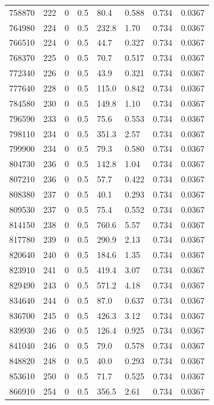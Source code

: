 \documentclass[preview]{standalone}
\begin{document}
{{{{{{{{{{{{\begin{tabular}{L{1.2cm}C{1.2cm} C{0.3cm}C{0.5cm} C{1.4cm}C{1.4cm} C{1.4cm}C{1.4cm}}
  758870  &   222  & 0     & 0.5 &  80.4  & 0.588  & 0.734 &  0.0367   \\ 
  764980  &   224  & 0     & 0.5 &  232.8  & 1.70  & 0.734 &  0.0367   \\ 
  766510  &   224  & 0     & 0.5 &  44.7  & 0.327  & 0.734 &  0.0367   \\ 
  768370  &   225  & 0     & 0.5 &  70.7  & 0.517  & 0.734 &  0.0367   \\ 
  772340  &   226  & 0     & 0.5 &  43.9  & 0.321  & 0.734 &  0.0367   \\ 
  777640  &   228  & 0     & 0.5 &  115.0  & 0.842  & 0.734 &  0.0367   \\ 
  784580  &   230  & 0     & 0.5 &  149.8  & 1.10  & 0.734 &  0.0367   \\ 
  796590  &   233  & 0     & 0.5 &  75.6  & 0.553  & 0.734 &  0.0367   \\ 
  798110  &   234  & 0     & 0.5 &  351.3  & 2.57  & 0.734 &  0.0367   \\ 
  799900  &   234  & 0     & 0.5 &  79.3  & 0.580  & 0.734 &  0.0367   \\ 
  804730  &   236  & 0     & 0.5 &  142.8  & 1.04  & 0.734 &  0.0367   \\ 
  807210  &   236  & 0     & 0.5 &  57.7  & 0.422  & 0.734 &  0.0367   \\ 
  808380  &   237  & 0     & 0.5 &  40.1  & 0.293  & 0.734 &  0.0367   \\ 
  809530  &   237  & 0     & 0.5 &  75.4  & 0.552  & 0.734 &  0.0367   \\ 
  814150  &   238  & 0     & 0.5 &  760.6  & 5.57  & 0.734 &  0.0367   \\ 
  817780  &   239  & 0     & 0.5 &  290.9  & 2.13  & 0.734 &  0.0367   \\ 
  820640  &   240  & 0     & 0.5 &  184.6  & 1.35  & 0.734 &  0.0367   \\ 
  823910  &   241  & 0     & 0.5 &  419.4  & 3.07  & 0.734 &  0.0367   \\ 
  829490  &   243  & 0     & 0.5 &  571.2  & 4.18  & 0.734 &  0.0367   \\ 
  834640  &   244  & 0     & 0.5 &  87.0  & 0.637  & 0.734 &  0.0367   \\ 
  836700  &   245  & 0     & 0.5 &  426.3  & 3.12  & 0.734 &  0.0367   \\ 
  839930  &   246  & 0     & 0.5 &  126.4  & 0.925  & 0.734 &  0.0367   \\ 
  841040  &   246  & 0     & 0.5 &  79.0  & 0.578  & 0.734 &  0.0367   \\ 
  848820  &   248  & 0     & 0.5 &  40.0  & 0.293  & 0.734 &  0.0367   \\ 
  853610  &   250  & 0     & 0.5 &  71.7  & 0.525  & 0.734 &  0.0367   \\ 
  866910  &   254  & 0     & 0.5 &  356.5  & 2.61  & 0.734 &  0.0367   \\ 
\hline 
\end{tabular} 

}}}}}}}}}}}}
\end{document}
